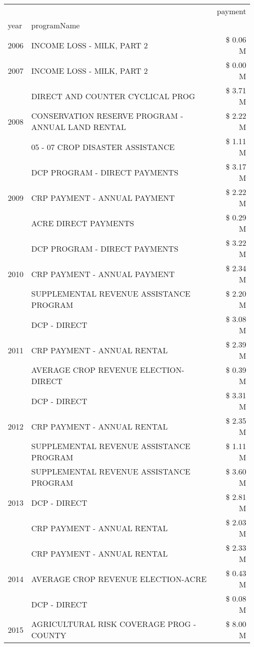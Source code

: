 \begin{tabular}{llr}
\toprule
 &  & payment \\
year & programName &  \\
\midrule
2006 & INCOME LOSS - MILK, PART 2 & \$ 0.06 M \\
\cline{1-3}
2007 & INCOME LOSS - MILK, PART 2 & \$ 0.00 M \\
\cline{1-3}
\multirow[t]{3}{*}{2008} & DIRECT AND COUNTER CYCLICAL PROG & \$ 3.71 M \\
 & CONSERVATION RESERVE PROGRAM - ANNUAL LAND RENTAL & \$ 2.22 M \\
 & 05 - 07 CROP DISASTER ASSISTANCE & \$ 1.11 M \\
\cline{1-3}
\multirow[t]{3}{*}{2009} & DCP PROGRAM - DIRECT PAYMENTS & \$ 3.17 M \\
 & CRP PAYMENT - ANNUAL PAYMENT & \$ 2.22 M \\
 & ACRE DIRECT PAYMENTS & \$ 0.29 M \\
\cline{1-3}
\multirow[t]{3}{*}{2010} & DCP PROGRAM - DIRECT PAYMENTS & \$ 3.22 M \\
 & CRP PAYMENT - ANNUAL PAYMENT & \$ 2.34 M \\
 & SUPPLEMENTAL REVENUE ASSISTANCE PROGRAM & \$ 2.20 M \\
\cline{1-3}
\multirow[t]{3}{*}{2011} & DCP - DIRECT & \$ 3.08 M \\
 & CRP PAYMENT - ANNUAL RENTAL & \$ 2.39 M \\
 & AVERAGE CROP REVENUE ELECTION-DIRECT & \$ 0.39 M \\
\cline{1-3}
\multirow[t]{3}{*}{2012} & DCP - DIRECT & \$ 3.31 M \\
 & CRP PAYMENT - ANNUAL RENTAL & \$ 2.35 M \\
 & SUPPLEMENTAL REVENUE ASSISTANCE PROGRAM & \$ 1.11 M \\
\cline{1-3}
\multirow[t]{3}{*}{2013} & SUPPLEMENTAL REVENUE ASSISTANCE PROGRAM & \$ 3.60 M \\
 & DCP - DIRECT & \$ 2.81 M \\
 & CRP PAYMENT - ANNUAL RENTAL & \$ 2.03 M \\
\cline{1-3}
\multirow[t]{3}{*}{2014} & CRP PAYMENT - ANNUAL RENTAL & \$ 2.33 M \\
 & AVERAGE CROP REVENUE ELECTION-ACRE & \$ 0.43 M \\
 & DCP - DIRECT & \$ 0.08 M \\
\cline{1-3}
\multirow[t]{3}{*}{2015} & AGRICULTURAL RISK COVERAGE PROG - COUNTY & \$ 8.00 M \\

\end{tabular}
